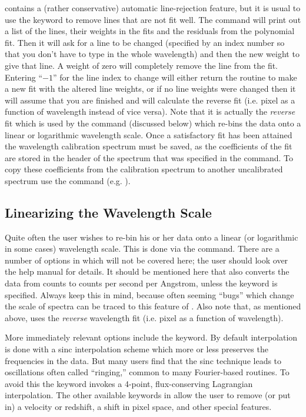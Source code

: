  contains a (rather conservative) automatic line-rejection
feature, but it is usual to use the  keyword to remove lines that
are not fit well.  The  command will print out a list of the
lines, their weights in the fits and the residuals from the polynomial fit.
Then it will ask for a line to be changed (specified by an index number so
that you don't have to type in the whole wavelength) and then the new weight
to give that line. A weight of zero will completely remove the line from the
fit. Entering ``$-1$'' for the line index to change will either return the
routine to make a new fit with the altered line weights, or if no line weights
were changed then it will assume that you are finished and will calculate the
reverse fit (i.e. pixel as a function of wavelength instead of vice versa).
Note that it is actually the {\it reverse} fit which is used by the
 command (discussed below) which re-bins the data onto a linear or
logarithmic wavelength scale.  Once a satisfactory fit has been attained the
wavelength calibration spectrum must be saved, as the coefficients of the fit
are stored in the header of the spectrum that was specified in the
 command.  To copy these coefficients from the calibration
spectrum to another uncalibrated spectrum use the  command (e.g.
).

\subsection{Linearizing the Wavelength Scale}

Quite often the user wishes to re-bin his or her data onto a linear (or
logarithmic in some cases) wavelength scale.  This is done via the
 command.  There are a number of options in  which
will not be covered here; the user should look over the help manual for
details.  It should be mentioned here that  also converts the data
from counts to counts per second per Angstrom, unless the  keyword
is specified. Always keep this in mind, because often seeming ``bugs'' which
change the scale of spectra can be traced to this feature of .
Also note that, as mentioned above,  uses the {\it reverse}
wavelength fit (i.e. pixel as a function of wavelength).

More immediately relevant options include the  keyword. By default
interpolation is done with a sinc interpolation scheme which more or less
preserves the frequencies in the data.  But many users find that the sinc
technique leads to oscillations often called ``ringing,'' common to many
Fourier-based routines.  To avoid this the  keyword invokes a
4-point, flux-conserving Lagrangian interpolation.  The other available
keywords in  allow the user to remove (or put in) a velocity or
redshift, a shift in pixel space, and other special features.

